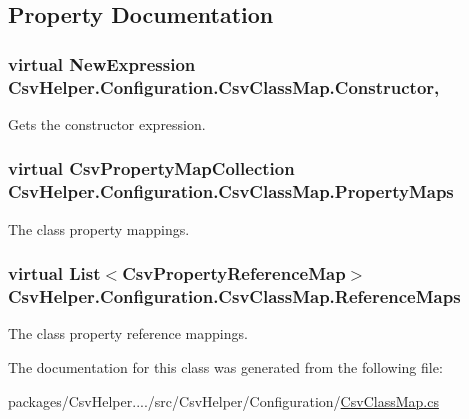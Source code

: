 \subsection{Property Documentation}
\hypertarget{a00040_ae8038b36db7584ef1a73852fcc46404b}{
\subsubsection[{Constructor}]{\setlength{\rightskip}{0pt plus 5cm}virtual New\-Expression Csv\-Helper.\-Configuration.\-Csv\-Class\-Map.\-Constructor\hspace{0.3cm}{\ttfamily [get]}, {\ttfamily [set]}}}\label{a00040_ae8038b36db7584ef1a73852fcc46404b}


Gets the constructor expression. 

\hypertarget{a00040_a9580e897abcba144f3101eb983348e25}{
\subsubsection[{Property\-Maps}]{\setlength{\rightskip}{0pt plus 5cm}virtual {\bf Csv\-Property\-Map\-Collection} Csv\-Helper.\-Configuration.\-Csv\-Class\-Map.\-Property\-Maps\hspace{0.3cm}{\ttfamily [get]}}}\label{a00040_a9580e897abcba144f3101eb983348e25}


The class property mappings. 

\hypertarget{a00040_a6dfbf8f743b16d2ec83edef865ea2d9e}{
\subsubsection[{Reference\-Maps}]{\setlength{\rightskip}{0pt plus 5cm}virtual List$<${\bf Csv\-Property\-Reference\-Map}$>$ Csv\-Helper.\-Configuration.\-Csv\-Class\-Map.\-Reference\-Maps\hspace{0.3cm}{\ttfamily [get]}}}\label{a00040_a6dfbf8f743b16d2ec83edef865ea2d9e}


The class property reference mappings. 



The documentation for this class was generated from the following file\-:\begin{DoxyCompactItemize}
\item 
packages/\-Csv\-Helper..../src/\-Csv\-Helper/\-Configuration/\hyperlink{a00182}{Csv\-Class\-Map.\-cs}\end{DoxyCompactItemize}
